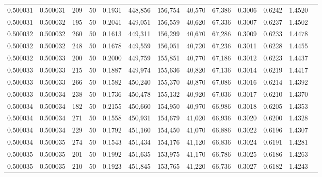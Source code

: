 \begin{tabular}{rrrrrrrrrrrrr}
0.500031 & 0.500031 &   209 &  50 &                                     0.1931 & 448,856 & 156,754 &  40,570 &  67,386 & 0.3006 & 0.6242 & 1.4520 \\
0.500031 & 0.500032 &   195 &  50 &                                     0.2041 & 449,051 & 156,559 &  40,620 &  67,336 & 0.3007 & 0.6237 & 1.4502 \\
0.500032 & 0.500032 &   260 &  50 &                                     0.1613 & 449,311 & 156,299 &  40,670 &  67,286 & 0.3009 & 0.6233 & 1.4478 \\
0.500032 & 0.500032 &   248 &  50 &                                     0.1678 & 449,559 & 156,051 &  40,720 &  67,236 & 0.3011 & 0.6228 & 1.4455 \\
0.500032 & 0.500033 &   200 &  50 &                                     0.2000 & 449,759 & 155,851 &  40,770 &  67,186 & 0.3012 & 0.6223 & 1.4437 \\
0.500033 & 0.500033 &   215 &  50 &                                     0.1887 & 449,974 & 155,636 &  40,820 &  67,136 & 0.3014 & 0.6219 & 1.4417 \\
0.500033 & 0.500033 &   266 &  50 &                                     0.1582 & 450,240 & 155,370 &  40,870 &  67,086 & 0.3016 & 0.6214 & 1.4392 \\
0.500033 & 0.500034 &   238 &  50 &                                     0.1736 & 450,478 & 155,132 &  40,920 &  67,036 & 0.3017 & 0.6210 & 1.4370 \\
0.500034 & 0.500034 &   182 &  50 &                                     0.2155 & 450,660 & 154,950 &  40,970 &  66,986 & 0.3018 & 0.6205 & 1.4353 \\
0.500034 & 0.500034 &   271 &  50 &                                     0.1558 & 450,931 & 154,679 &  41,020 &  66,936 & 0.3020 & 0.6200 & 1.4328 \\
0.500034 & 0.500034 &   229 &  50 &                                     0.1792 & 451,160 & 154,450 &  41,070 &  66,886 & 0.3022 & 0.6196 & 1.4307 \\
0.500034 & 0.500035 &   274 &  50 &                                     0.1543 & 451,434 & 154,176 &  41,120 &  66,836 & 0.3024 & 0.6191 & 1.4281 \\
0.500035 & 0.500035 &   201 &  50 &                                     0.1992 & 451,635 & 153,975 &  41,170 &  66,786 & 0.3025 & 0.6186 & 1.4263 \\
0.500035 & 0.500035 &   210 &  50 &                                     0.1923 & 451,845 & 153,765 &  41,220 &  66,736 & 0.3027 & 0.6182 & 1.4243 \\

\end{tabular}
